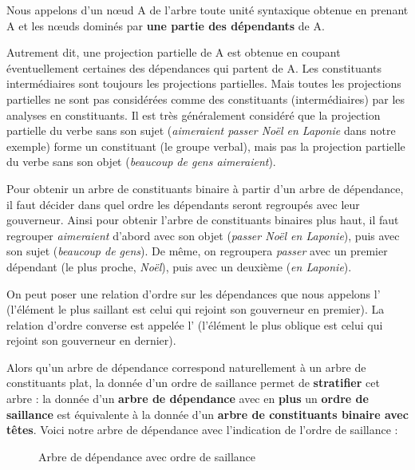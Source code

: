 \begin{styleLivreImportant}
Nous appelons  d’un nœud A de l’arbre toute unité syntaxique obtenue en prenant A et les nœuds dominés par \textbf{une partie des dépendants} de A.
\end{styleLivreImportant}

Autrement dit, une projection partielle de A est obtenue en coupant éventuellement certaines des dépendances qui partent de A. Les constituants intermédiaires sont toujours les projections partielles. Mais toutes les projections partielles ne sont pas  considérées comme des constituants (intermédiaires) par les analyses en constituants. Il est très généralement considéré que la projection partielle du verbe sans son sujet (\textit{aimeraient passer Noël en Laponie} dans notre exemple) forme un constituant (le groupe verbal), mais pas la projection partielle du verbe sans son objet (\textit{beaucoup de gens aimeraient}).

Pour obtenir un arbre de constituants binaire à partir d’un arbre de dépendance, il faut décider dans quel ordre les dépendants seront regroupés avec leur gouverneur. Ainsi pour obtenir l’arbre de constituants binaires plus haut, il faut regrouper \textit{aimeraient} d’abord avec son objet (\textit{passer Noël en Laponie}), puis avec son sujet (\textit{beaucoup de gens}). De même, on regroupera \textit{passer} avec un premier dépendant (le plus proche, \textit{Noël}), puis avec un deuxième (\textit{en Laponie}).

On peut poser une relation d’ordre sur les dépendances que nous appelons l’ (l’élément le plus saillant est celui qui rejoint son gouverneur en premier). La relation d’ordre converse est appelée l’ (l’élément le plus oblique est celui qui rejoint son gouverneur en dernier).

Alors qu’un arbre de dépendance correspond naturellement à un arbre de constituants plat, la donnée d’un ordre de saillance permet de \textbf{stratifier} cet arbre : la donnée d’un \textbf{arbre de dépendance} avec en \textbf{plus} un \textbf{ordre de saillance} est équivalente à la donnée d’un \textbf{arbre de constituants binaire avec têtes}. Voici notre arbre de dépendance avec l’indication de l’ordre de saillance :

\begin{figure}

\caption{\label{fig:}Arbre de dépendance avec ordre de saillance}

\end{figure}

